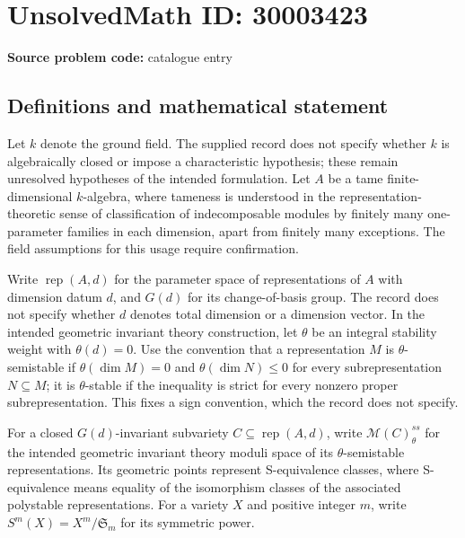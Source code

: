 \documentclass[11pt]{article}
\begin{document}
\section*{UnsolvedMath ID: 30003423}
\textbf{Source problem code:} catalogue entry
\subsection{Definitions and mathematical statement}
Let \(k\) denote the ground field. The supplied record does not specify whether \(k\) is algebraically closed or impose a characteristic hypothesis; these remain unresolved hypotheses of the intended formulation. Let \(A\) be a tame finite-dimensional \(k\)-algebra, where tameness is understood in the representation-theoretic sense of classification of indecomposable modules by finitely many one-parameter families in each dimension, apart from finitely many exceptions. The field assumptions for this usage require confirmation.

Write \(\operatorname{rep}(A,d)\) for the parameter space of representations of \(A\) with dimension datum \(d\), and \(G(d)\) for its change-of-basis group. The record does not specify whether \(d\) denotes total dimension or a dimension vector. In the intended geometric invariant theory construction, let \(\theta\) be an integral stability weight with \(\theta(d)=0\). Use the convention that a representation \(M\) is \(\theta\)-semistable if \(\theta(\dim M)=0\) and \(\theta(\dim N)\leq 0\) for every subrepresentation \(N\subseteq M\); it is \(\theta\)-stable if the inequality is strict for every nonzero proper subrepresentation. This fixes a sign convention, which the record does not specify.

For a closed \(G(d)\)-invariant subvariety \(C\subseteq\operatorname{rep}(A,d)\), write \(\mathcal M(C)_{\theta}^{ss}\) for the intended geometric invariant theory moduli space of its \(\theta\)-semistable representations. Its geometric points represent S-equivalence classes, where S-equivalence means equality of the isomorphism classes of the associated polystable representations. For a variety \(X\) and positive integer \(m\), write \(S^m(X)=X^m/\mathfrak S_m\) for its symmetric power.
\end{document}
